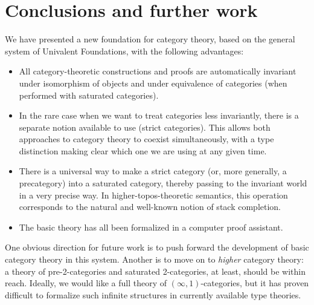 \documentclass{mscs}
\numberwithin{equation}{section}
\begin{document}
\section{Conclusions and further work}
\label{sec:conclusion}

We have presented a new foundation for category theory, based on the general system of Univalent Foundations, with the following advantages:
\begin{itemize}
\item All category-theoretic constructions and proofs are automatically invariant under isomorphism of objects and under equivalence of categories (when performed with saturated categories).
\item In the rare case when we want to treat categories less invariantly, there is a separate notion available to use (strict categories).
  This allows both approaches to category theory to coexist simultaneously, with a type distinction making clear which one we are using at any given time.
\item There is a universal way to make a strict category (or, more generally, a precategory) into a saturated category, thereby passing to the invariant world in a very precise way.
  In higher-topos-theoretic semantics, this operation corresponds to the natural and well-known notion of stack completion.
\item The basic theory has all been formalized in a computer proof assistant.
\end{itemize}
One obvious direction for future work is to push forward the development of basic category theory in this system.
Another is to move on to \emph{higher} category theory: a theory of pre-2-categories and saturated 2-categories, at least, should be within reach.
Ideally, we would like a full theory of $(\infty,1)$-categories, but it has proven difficult to formalize such infinite structures in currently available type theories.


% 
% 

\printbibliography
\end{document}
